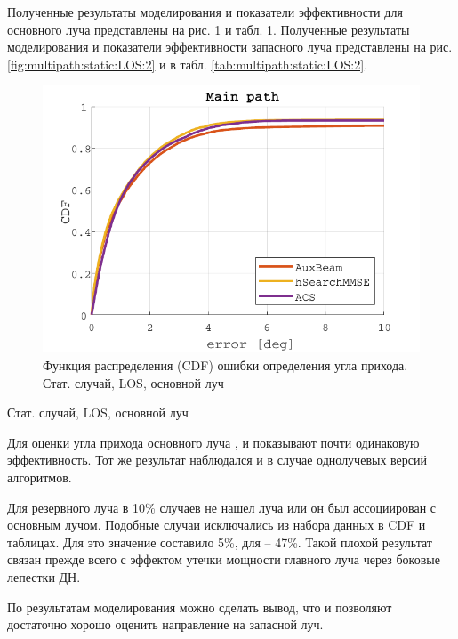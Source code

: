 Полученные результаты моделирования и показатели эффективности для основного
луча представлены на рис. \ref{fig:multipath:static:LOS:1}  и табл.
\ref{fig:multipath:static:LOS:1}. Полученные результаты моделирования и
показатели эффективности запасного луча представлены на рис.
\ref{fig:multipath:static:LOS:2} и в табл. \ref{tab:multipath:static:LOS:2}.
\begin{figure}[H]
  \centering
  \includegraphics{results/rus/multipath-static-LOS-1}
  \caption{Функция распределения (CDF) ошибки определения угла прихода. Стат. случай, LOS, основной луч}
  \label{fig:multipath:static:LOS:1}
\end{figure}
\begin{table}[H]
  \begin{center}
    \caption{Стат. случай, LOS, основной луч}
    \label{tab:multipath:static:LOS:1}
  \end{center}
\end{table}
Для оценки угла прихода основного луча \AuxBeam{}, \hSearchMMSE{} и \ACS{} показывают
почти одинаковую эффективность. Тот же результат
наблюдался и в случае однолучевых версий алгоритмов. 

Для резервного луча \hSearchMMSE{} в 10\% случаев не нашел луча или он был ассоциирован 
с основным лучом. Подобные случаи исключались из набора данных в CDF и таблицах.
Для \AuxBeam{} это значение составило 5\%, для \ACS{} -- 47\%. Такой плохой результат 
\ACS{} связан прежде всего с эффектом утечки мощности главного луча через 
боковые лепестки ДН. 

По результатам моделирования можно сделать вывод, что \AuxBeam{} и
\hSearchMMSE{} позволяют достаточно хорошо оценить направление на запасной луч.

